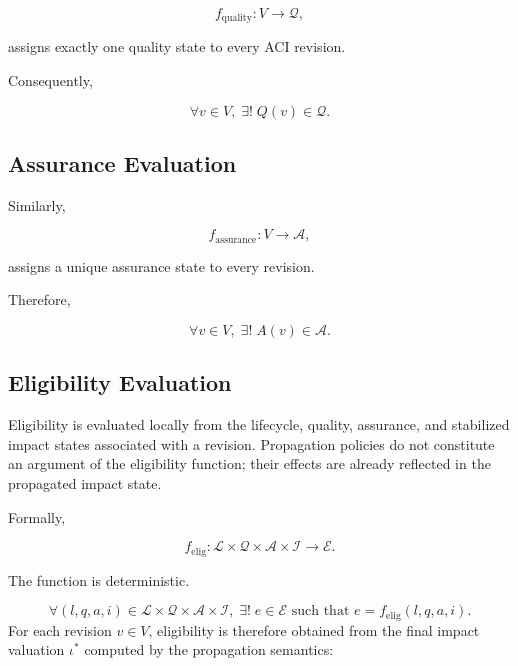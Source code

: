 \documentclass[10pt]{article}
\begin{document}
	\begin{equation}
		f_{\mathrm{quality}} : V \rightarrow \mathcal{Q},
		\label{eq:quality_function}
	\end{equation}
	
	assigns exactly one quality state to every ACI revision.
	
	Consequently,
	
	\begin{equation}
		\forall v\in V,\;
		\exists!\;
		Q(v)\in\mathcal{Q}.
		\label{eq:quality_total}
	\end{equation}
	
	\subsection{Assurance Evaluation}
	
	Similarly,
	
	\begin{equation}
		f_{\mathrm{assurance}} : V \rightarrow \mathcal{A},
		\label{eq:assurance_function}
	\end{equation}
	
	assigns a unique assurance state to every revision.
	
	Therefore,
	
	\begin{equation}
		\forall v\in V,\;
		\exists!\;
		A(v)\in\mathcal{A}.
		\label{eq:assurance_total}
	\end{equation}
	
	\subsection{Eligibility Evaluation}
	
	Eligibility is evaluated locally from the lifecycle, quality, assurance, and
	stabilized impact states associated with a revision. Propagation policies do
	not constitute an argument of the eligibility function; their effects are
	already reflected in the propagated impact state.
	
	Formally,
	
	\begin{equation}
		f_{\mathrm{elig}} :
		\mathcal{L}
		\times
		\mathcal{Q}
		\times
		\mathcal{A}
		\times
		\mathcal{I}
		\rightarrow
		\mathcal{E}.
		\label{eq:eligibility_function}
	\end{equation}
	
	The function is deterministic.
	
	\begin{equation}
		\forall
		(l,q,a,i)
		\in
		\mathcal{L}
		\times
		\mathcal{Q}
		\times
		\mathcal{A}
		\times
		\mathcal{I},
		\;
		\exists!\;
		e
		\in
		\mathcal{E}
		\text{ such that }
		e
		=
		f_{\mathrm{elig}}(l,q,a,i).
		\label{eq:eligibility_deterministic}
	\end{equation}
	For each revision $v\in V$, eligibility is therefore obtained from the final
	impact valuation $\iota^{*}$ computed by the propagation semantics:
	
\end{document}
